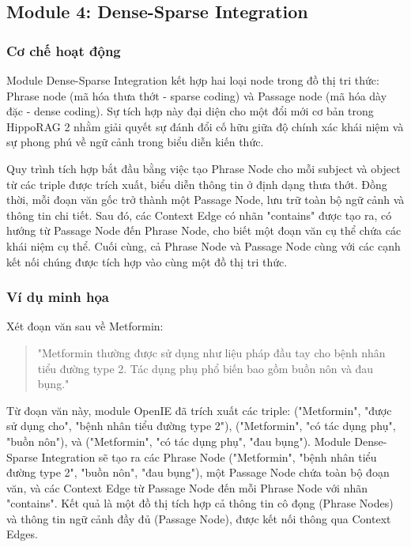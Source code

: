 \subsection{Module 4: Dense-Sparse Integration}

\subsubsection{Cơ chế hoạt động}
Module Dense-Sparse Integration kết hợp hai loại node trong đồ thị tri thức: Phrase node (mã hóa thưa thớt - sparse coding) và Passage node (mã hóa dày đặc - dense coding). Sự tích hợp này đại diện cho một đổi mới cơ bản trong HippoRAG 2 nhằm giải quyết sự đánh đổi cố hữu giữa độ chính xác khái niệm và sự phong phú về ngữ cảnh trong biểu diễn kiến thức.

Quy trình tích hợp bắt đầu bằng việc tạo Phrase Node cho mỗi subject và object từ các triple được trích xuất, biểu diễn thông tin ở định dạng thưa thớt. Đồng thời, mỗi đoạn văn gốc trở thành một Passage Node, lưu trữ toàn bộ ngữ cảnh và thông tin chi tiết. Sau đó, các Context Edge có nhãn "contains" được tạo ra, có hướng từ Passage Node đến Phrase Node, cho biết một đoạn văn cụ thể chứa các khái niệm cụ thể. Cuối cùng, cả Phrase Node và Passage Node cùng với các cạnh kết nối chúng được tích hợp vào cùng một đồ thị tri thức.

\subsubsection{Ví dụ minh họa}
Xét đoạn văn sau về Metformin:

\begin{quote}
"Metformin thường được sử dụng như liệu pháp đầu tay cho bệnh nhân tiểu đường type 2. Tác dụng phụ phổ biến bao gồm buồn nôn và đau bụng."
\end{quote}

Từ đoạn văn này, module OpenIE đã trích xuất các triple: ("Metformin", "được sử dụng cho", "bệnh nhân tiểu đường type 2"), ("Metformin", "có tác dụng phụ", "buồn nôn"), và ("Metformin", "có tác dụng phụ", "đau bụng"). Module Dense-Sparse Integration sẽ tạo ra các Phrase Node ("Metformin", "bệnh nhân tiểu đường type 2", "buồn nôn", "đau bụng"), một Passage Node chứa toàn bộ đoạn văn, và các Context Edge từ Passage Node đến mỗi Phrase Node với nhãn "contains". Kết quả là một đồ thị tích hợp cả thông tin cô đọng (Phrase Nodes) và thông tin ngữ cảnh đầy đủ (Passage Node), được kết nối thông qua Context Edges.

